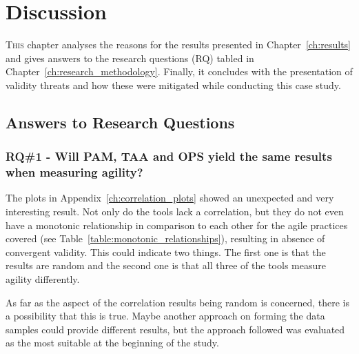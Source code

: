 %


\chapter{Discussion}
\label{ch:discussion}
\lettrine[lines=4, loversize=-0.1, lraise=0.1]{T}{his} chapter analyses the reasons for the results presented in Chapter~\ref{ch:results} and gives answers to the research questions (RQ) tabled in Chapter~\ref{ch:research_methodology}. Finally, it concludes with the presentation of validity threats and how these were mitigated while conducting this case study.

\section{Answers to Research Questions}

\subsection{RQ\#1 - Will \ac{PAM}, \ac{TAA} and \ac{OPS} yield the same results when measuring agility?}

The plots in Appendix~\ref{ch:correlation_plots} showed an unexpected and very interesting result. Not only do the tools lack a correlation, but they do not even have a monotonic relationship in comparison to each other for the agile practices covered (see Table~\ref{table:monotonic_relationships}), resulting in absence of convergent validity. This could indicate two things. The first one is that the results are random and the second one is that all three of the tools measure agility differently. 

As far as the aspect of the correlation results being random is concerned, there is a possibility that this is true. Maybe another approach on forming the data samples could provide different results, but the approach followed was evaluated as the most suitable at the beginning of the study.

